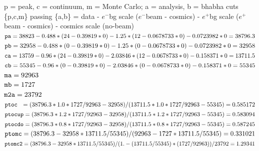 \documentclass[landscape]{article}
\begin{document}
\vfill

{\large

p = peak, c = continuum, m = Monte Carlo; a = analysis, b = bhabha cuts \\
\{p,c,m\} passing \{a,b\} = data - $e^-$bg scale ($e^-$beam - cosmics) - $e^+$bg scale ($e^+$beam - cosmics) - cosmics scale (no-beam) \\

 ${\tt pa}  = 38823 - 0.488 * ( 24 - 0.39819 * 0 ) - 1.25 * ( 12 - 0.0678733 * 0 ) - 0.0723982 * 0 = 38796.3 $ \\
 ${\tt pb}  = 32958 - 0.488 * ( 0 - 0.39819 * 0 ) - 1.25 * ( 0 - 0.0678733 * 0 ) - 0.0723982 * 0 = 32958 $ \\
 ${\tt ca}  = 13759 - 0.96 * ( 24 - 0.39819 * 0 ) - 2.03846 * ( 12 - 0.0678733 * 0 ) - 0.158371 * 0 = 13711.5 $ \\
 ${\tt cb}  = 55345 - 0.96 * ( 0 - 0.39819 * 0 ) - 2.03846 * ( 0 - 0.0678733 * 0 ) - 0.158371 * 0 = 55345 $ \\
 ${\tt ma}  = 92963 $ \\
 ${\tt mb}  = 1727 $ \\
 ${\tt m2a} = 23792 $ \\
 ${\tt ptoc\mbox{ }\mbox{ }}   = ( 38796.3 * 1.0 * 1727 / 92963 - 32958 ) / ( 13711.5 * 1.0 * 1727 / 92963 - 55345 ) = 0.585172 $ \\
 ${\tt ptocup} = ( 38796.3 * 1.2 * 1727 / 92963 - 32958 ) / ( 13711.5 * 1.2 * 1727 / 92963 - 55345 ) = 0.583094 $ \\
 ${\tt ptocdo} = ( 38796.3 * 0.8 * 1727 / 92963 - 32958 ) / ( 13711.5 * 0.8 * 1727 / 92963 - 55345 ) = 0.587245 $ \\
 ${\tt ptomc}  = ( 38796.3 - 32958 * 13711.5 / 55345 ) / ( 92963 - 1727 * 13711.5 / 55345 ) = 0.331021 $ \\
 ${\tt ptomc2} = ( 38796.3 - 32958 * 13711.5 / 55345 ) / ( 1. - ( 13711.5 / 55345 ) * ( 1727 / 92963 ) ) / 23792 = 1.29341 $ \\


}

\vfill

\pagebreak

\mbox{ }

\vfill
\end{document}
